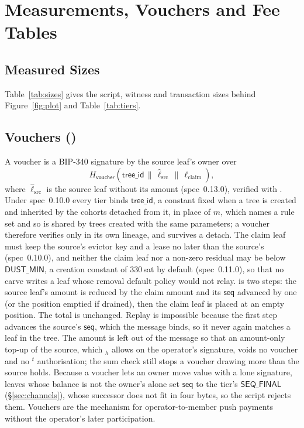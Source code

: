 \section{Measurements, Vouchers and Fee Tables}\label{app:eval}

\subsection{Measured Sizes}

Table~\ref{tab:sizes} gives the script, witness and transaction sizes
behind Figure~\ref{fig:plot} and Table~\ref{tab:tiers}.





\subsection{Vouchers ()}\label{app:claim}

A voucher is a BIP-340 signature by the source leaf's owner over
\[
H_{\mathsf{voucher}}(\mathsf{tree\_id} \,\|\, \hat\ell_{\mathrm{src}} \,\|\, \ell_{\mathrm{claim}}),
\]
where $\hat\ell_{\mathrm{src}}$ is the source leaf without its amount
(spec~0.13.0),
verified with . Under spec~0.10.0 every tier binds
$\mathsf{tree\_id}$, a constant fixed when a tree is created and
inherited by the cohorts detached from it, in place of $m$, which names
a rule set and so is shared by trees created with the same parameters;
a voucher therefore verifies only in its own lineage, and survives a
detach. The claim leaf must keep the source's evictor key and a lease no
later than the source's (spec~0.10.0), and neither the claim leaf nor a
non-zero residual may be below $\mathsf{DUST\_MIN}$, a creation constant
of 330\,sat by default (spec~0.11.0), so that no carve writes a leaf
whose removal default policy would not relay.
 is two steps: the source
leaf's amount is reduced by the claim amount and its $\mathsf{seq}$
advanced by one (or the position emptied if drained), then the claim leaf
is placed at an empty position. The total is unchanged. Replay is
impossible because the first step advances the source's $\mathsf{seq}$,
which the message binds, so it never again matches a leaf in the tree.
The amount is left out of the message so that an amount-only top-up of
the source, which $_h$ allows on the operator's signature,
voids no voucher and no $^{t}$ authorisation; the sum check
still stops a voucher drawing more than the source holds. Because a voucher lets an owner move value with a lone
signature, leaves whose balance is not the owner's alone set
$\mathsf{seq}$ to the tier's $\mathsf{SEQ\_FINAL}$ (\S\ref{sec:channels}),
whose successor does not fit in four bytes, so the  script
rejects them. Vouchers are the mechanism for
operator-to-member push payments without the operator's later
participation.

